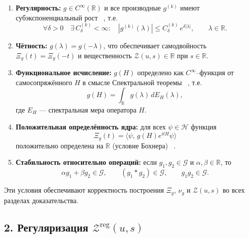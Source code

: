 \documentclass{article}
\numberwithin{equation}{section}
\theoremstyle{plain}
\theoremstyle{definition}
\theoremstyle{remark}
\def\alpha{α}\def\beta{β}\def\gamma{γ}\def\Gamma{Γ}%
\def\delta{δ}\def\Delta{Δ}\def\epsilon{ε}\def\zeta{ζ}%
\def\infty{∞}\def\partial{∂}\def\sum{Σ}\def\int{∫}%
\begin{document}
\begin{enumerate}
\item[\textnormal{(G1)}] \textbf{Регулярность:} $g\in C^\infty(\mathbb R)$ и все производные $g^{(k)}$ имеют субэкспоненциальный рост ~\cite{GelfandShilov1968}, т.е.
\begin{equation}
\forall \delta>0\quad \exists\, C_\delta^{(k)}<\infty:\quad 
|g^{(k)}(\lambda)| \le C_\delta^{(k)}\,e^{\delta|\lambda|},\qquad \lambda\in\mathbb R.
\end{equation}

\item[\textnormal{(G2)}] \textbf{Чётность:} $g(\lambda)=g(-\lambda)$, что обеспечивает самодвойность $\Xi_g(t)=\Xi_g(-t)$ и вещественность $\mathcal Z(u,s)\in\mathbb R$ при $s\in\mathbb R$.

\item[\textnormal{(G3)}] \textbf{Функциональное исчисление:} $g(H)$ определено как $C^\infty$–функция от самосопряжённого $H$ в смысле Спектральной теоремы ~\cite{ReedSimonI}, т.е.
\begin{equation}
g(H)=\int_{\mathbb R} g(\lambda)\,dE_H(\lambda),
\end{equation}
где $E_H$ — спектральная мера оператора $H$.

\item[\textnormal{(G4)}] \textbf{Положительная определённость ядра:}
для всех $\psi\in\mathcal H$ функция
\begin{equation}
\Xi_g(t)=\langle \psi,\,g(H)e^{itH}\psi\rangle
\end{equation}
положительно определена на $\mathbb R$ (условие Бохнера) ~\cite{Rudin1991}.

\item[\textnormal{(G5)}] \textbf{Стабильность относительно операций:}
если $g_1,g_2\in\mathcal G$ и $\alpha,\beta\in\mathbb R$, то
\begin{equation}
\alpha g_1+\beta g_2\in\mathcal G,\qquad
(g_1\ast g_2)\in\mathcal G,\qquad
g_1g_2\in\mathcal G.
\end{equation}
\end{enumerate}

Эти условия обеспечивают корректность построения $\Xi_g$, $\nu_g$ и $\mathcal Z(u,s)$ во всех разделах доказательства.

\subsection*{2. Регуляризация $\mathcal Z^{\mathrm{reg}}(u,s)$}
\label{sec:Zreg}
\end{document}
